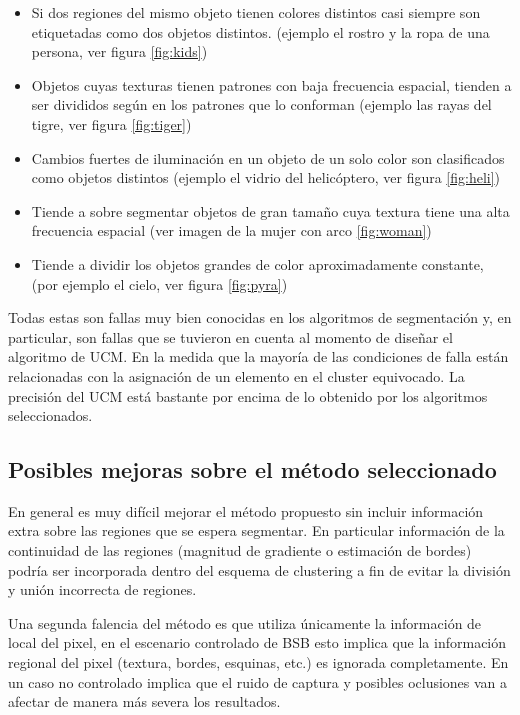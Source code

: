 \documentclass[10pt,twocolumn,letterpaper]{article}
\begin{document}
\begin{itemize}
\item Si dos regiones del mismo objeto tienen  colores distintos casi siempre son etiquetadas como dos objetos distintos. (ejemplo el rostro y la ropa de una persona, ver figura \ref{fig:kids})
\item  Objetos cuyas texturas tienen patrones con baja frecuencia espacial, tienden a ser divididos según en los patrones que lo conforman (ejemplo las rayas del tigre, ver figura \ref{fig:tiger})
\item Cambios fuertes de iluminación en un objeto de un solo color son clasificados como objetos distintos  (ejemplo el vidrio del helicóptero, ver figura \ref{fig:heli})
\item Tiende a sobre segmentar objetos de gran tamaño cuya textura tiene una alta frecuencia espacial (ver imagen de la mujer con arco \ref{fig:woman})
\item Tiende a dividir los objetos grandes de color aproximadamente constante, (por ejemplo el cielo, ver figura \ref{fig:pyra})

\end{itemize}
Todas estas son fallas muy bien conocidas en los algoritmos de segmentación y, en particular, son fallas que se tuvieron en cuenta al momento de diseñar el algoritmo de UCM.
En la medida que la mayoría de las condiciones de falla están relacionadas con la asignación de un elemento en el cluster equivocado. La precisión del UCM está bastante por encima de lo obtenido por los algoritmos seleccionados.

\subsection{Posibles mejoras sobre el método seleccionado}
En general es muy difícil mejorar el método propuesto sin incluir información extra sobre las regiones que se espera segmentar. En particular información de la continuidad de las regiones (magnitud de gradiente o estimación de bordes) podría ser incorporada dentro del esquema de clustering a fin de evitar la división y unión incorrecta de regiones.

Una segunda falencia del método es que utiliza únicamente la información de local del pixel, en el escenario controlado de BSB esto implica que la información regional del pixel (textura, bordes, esquinas, etc.) es ignorada completamente. En un caso no controlado implica que el ruido de captura y posibles oclusiones van a afectar de manera más severa los resultados.
\end{document}

